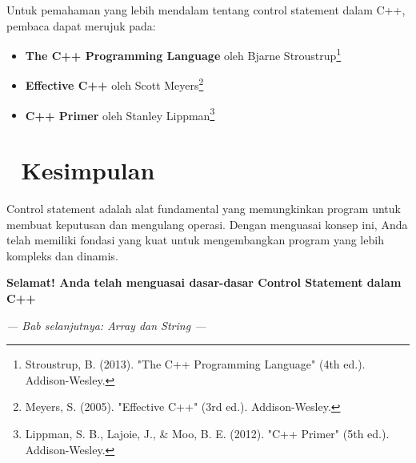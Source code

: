 Untuk pemahaman yang lebih mendalam tentang control statement dalam C++, pembaca dapat merujuk pada:

\begin{itemize}
\item \textbf{The C++ Programming Language} oleh Bjarne Stroustrup\footnote{Stroustrup, B. (2013). "The C++ Programming Language" (4th ed.). Addison-Wesley.}
\item \textbf{Effective C++} oleh Scott Meyers\footnote{Meyers, S. (2005). "Effective C++" (3rd ed.). Addison-Wesley.}
\item \textbf{C++ Primer} oleh Stanley Lippman\footnote{Lippman, S. B., Lajoie, J., \& Moo, B. E. (2012). "C++ Primer" (5th ed.). Addison-Wesley.}
\end{itemize}

\section{🎉 Kesimpulan}

Control statement adalah alat fundamental yang memungkinkan program untuk membuat keputusan dan mengulang operasi. Dengan menguasai konsep ini, Anda telah memiliki fondasi yang kuat untuk mengembangkan program yang lebih kompleks dan dinamis.

\begin{center}
\textbf{Selamat! Anda telah menguasai dasar-dasar Control Statement dalam C++} 🎯
\end{center}

\vspace{1cm}

\begin{center}
\textit{--- Bab selanjutnya: Array dan String ---}
\end{center}